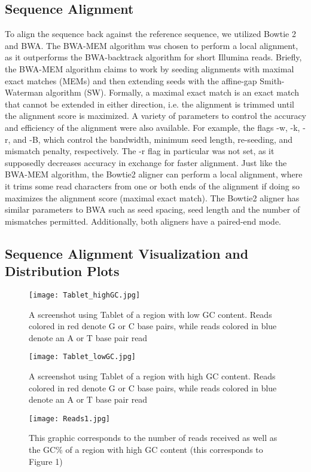 \documentclass[12pt]{article}
\begin{document}
\subsection{Sequence Alignment}
To align the sequence back against the reference sequence, we utilized Bowtie 2 and BWA. The BWA-MEM algorithm was chosen to perform a local alignment, as it outperforms the BWA-backtrack algorithm for short Illumina reads. Briefly, the BWA-MEM algorithm claims to work by seeding alignments with maximal exact matches (MEMs) and then extending seeds with the affine-gap Smith-Waterman algorithm (SW). Formally, a maximal exact match is an exact match that cannot be extended in either direction, i.e. the alignment is trimmed until the alignment score is maximized.  A variety of parameters to control the accuracy and efficiency of the alignment were also available. For example, the flags -w, -k, -r, and -B, which control the bandwidth, minimum seed length, re-seeding, and mismatch penalty, respectively. The -r flag in particular was not set, as it supposedly decreases accuracy in exchange for faster alignment.  Just like the BWA-MEM algorithm, the Bowtie2 aligner can perform a local alignment, where it trims some read characters from one or both ends of the alignment if doing so maximizes the alignment score (maximal exact match). The Bowtie2 aligner has similar parameters to BWA such as seed spacing, seed length and the number of mismatches permitted. Additionally, both aligners have a paired-end mode.

\subsection{Sequence Alignment Visualization and Distribution Plots}
\begin{figure}
    \centering
    \texttt{[image: Tablet\_highGC.jpg]}
    \caption{A screenshot using Tablet of a region with low GC content. Reads colored in red denote G or C base pairs, while reads colored in blue denote an A or T base pair read}
    \label{Figure 1}
    
    \texttt{[image: Tablet\_lowGC.jpg]}
    \caption{A screenshot using Tablet of a region with high GC content. Reads colored in red denote G or C base pairs, while reads colored in blue denote an A or T base pair read}
    \label{Figure 2}
\end{figure}

\begin{figure}
    \centering
    \texttt{[image: Reads1.jpg]}
    \caption{This graphic corresponds to the number of reads received as well as the GC\% of a region with high GC content (this corresponds to Figure 1)}
    \label{Figure 3}
\end{figure}
\end{document}

